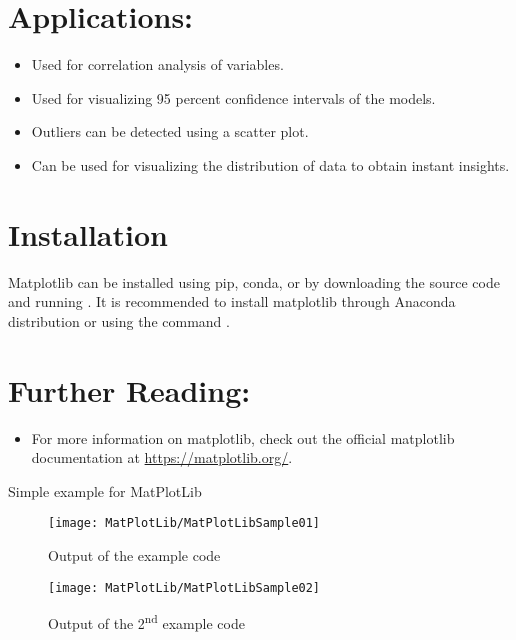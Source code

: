 \section{Applications:}

\begin{itemize}
    \item Used for correlation analysis of variables.
    \item Used for visualizing 95 percent confidence intervals of the models.
    \item Outliers can be detected using a scatter plot.
    \item Can be used for visualizing the distribution of data to obtain instant insights.
\end{itemize}

\section{Installation}

Matplotlib can be installed using pip, conda, or by downloading the source code and running . It is recommended to install matplotlib through Anaconda distribution or using the command .

\section{Further Reading:}

\begin{itemize}
    \item For more information on matplotlib, check out the official matplotlib documentation at \url{https://matplotlib.org/}.
\end{itemize}


\begin{code}
    
    
    \caption{Simple example for MatPlotLib}
\end{code}   

\begin{figure}
  \texttt{[image: MatPlotLib/MatPlotLibSample01]}
  
  \caption{Output of the example code}
\end{figure}

\begin{figure}
    \texttt{[image: MatPlotLib/MatPlotLibSample02]}
    
    \caption{Output of the 2\textsuperscript{nd} example code}
\end{figure}


